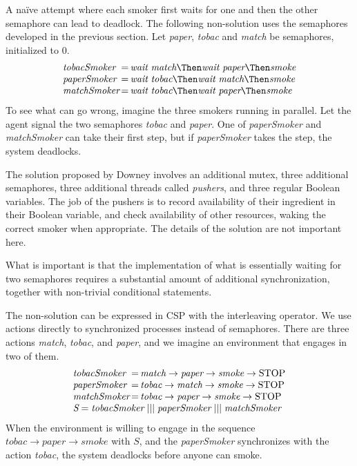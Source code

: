 A na\"ive attempt where each smoker first waits for one and then the other semaphore can lead to deadlock.
The following non-solution uses the semaphores developed in the previous section.
Let \emph{paper}, \emph{tobac} and \emph{match} be semaphores, initialized to 0.
\begin{equation*}
\begin{array}{l @{\,} c @{\,} l}
  \textit{tobacSmoker} & = & \textit{wait}\ \textit{match} \Then \textit{wait}\ \textit{paper} \Then \textit{smoke} \\
  \textit{paperSmoker} & = & \textit{wait}\ \textit{tobac} \Then \textit{wait}\ \textit{match} \Then \textit{smoke} \\
  \textit{matchSmoker} & = & \textit{wait}\ \textit{tobac} \Then \textit{wait}\ \textit{paper} \Then \textit{smoke} \\
\end{array}
\end{equation*}
To see what can go wrong, imagine the three smokers running in parallel.
Let the agent signal the two semaphores \emph{tobac} and \emph{paper}.
One of \emph{paperSmoker} and \emph{matchSmoker} can take their first step, but if \emph{paperSmoker} takes the step, the system deadlocks.

The solution proposed by Downey involves an additional mutex, three additional semaphores, three additional threads called \emph{pushers}, and three regular Boolean variables.
The job of the pushers is to record availability of their ingredient in their Boolean variable, and check availability of other resources, waking the correct smoker when appropriate.
The details of the solution are not important here.

What is important is that the implementation of what is essentially waiting for two semaphores requires a substantial amount of additional synchronization, together with non-trivial conditional statements.

The non-solution can be expressed in CSP with the interleaving operator.
We use actions directly to synchronized processes instead of semaphores.
There are three actions \emph{match}, \emph{tobac}, and \emph{paper}, and we imagine an environment that engages in two of them.
\begin{equation*}
\begin{array}{l @{\,} c @{\,} l}
  \textit{tobacSmoker} & = & \textit{match} \to \textit{paper} \to \textit{smoke} \to \text{STOP} \\
  \textit{paperSmoker} & = & \textit{tobac} \to \textit{match} \to \textit{smoke} \to \text{STOP} \\
  \textit{matchSmoker} & = & \textit{tobac} \to \textit{paper} \to \textit{smoke} \to \text{STOP} \\
  \multicolumn{3}{l}{\textit{S} = \textit{tobacSmoker} \mathrel{|||} \textit{paperSmoker} \mathrel{|||} \textit{matchSmoker}} \\
\end{array}
\end{equation*}
When the environment is willing to engage in the sequence $\textit{tobac} \to \textit{paper} \to \textit{smoke}$ with $S$, and the \emph{paperSmoker} synchronizes with the action \emph{tobac}, the system deadlocks before anyone can smoke.

